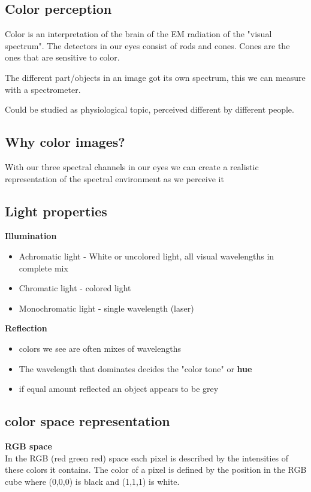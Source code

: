 \subsection*{Color perception}
Color is an interpretation of the brain of the EM radiation of the "visual spectrum". The detectors in our eyes consist of rods and cones. Cones are the ones that are sensitive to color. 

The different part/objects in an image got its own spectrum, this we can measure with a spectrometer. 

\begin{wbox}{}
Could be studied as physiological topic, perceived different by different people.
\end{wbox}


\subsection*{Why color images?}
With our three spectral channels in our eyes we can create a realistic representation of the spectral environment as we perceive it 


\subsection*{Light properties}
\textbf{Illumination}
\begin{itemize}
	\item Achromatic light - White or uncolored light, all visual wavelengths in complete mix
	\item Chromatic light - colored light
	\item Monochromatic light - single wavelength (laser)
\end{itemize}
\textbf{Reflection}
\begin{itemize}
	\item colors we see are often mixes of wavelengths
	\item The wavelength that dominates decides the "color tone" or \textbf{hue}
	\item if equal amount reflected an object appears to be grey
\end{itemize}


\subsection*{color space representation}
\textbf{RGB space} \\
In the RGB (red green red) space each pixel is described by the intensities of these colors it contains. The color of a pixel is defined by the position in the RGB cube where (0,0,0) is black and (1,1,1) is white.



